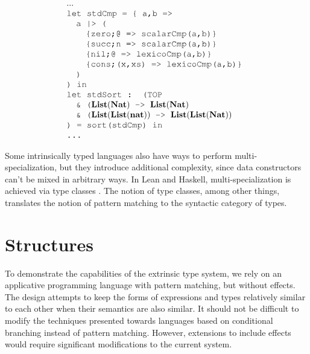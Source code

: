 \documentclass[acmsmall]{acmart}
\theoremstyle{definition}
\begin{document}
\[
  \begin{array}[t]{@{} l}
    ...
    \\
    \J{let stdCmp = \{ a,b => } 
    \\
    \I \J{a |> (}
    \\
    \I\I \J{\{zero;@ => scalarCmp(a,b)\}}
    \\
    \I\I \J{\{succ;n => scalarCmp(a,b)\}}
    \\
    \I\I \J{\{nil;@ => lexicoCmp(a,b)\}}
    \\
    \I\I \J{\{cons;(x,xs) => lexicoCmp(a,b)\}}
    \\
    \I \J{)}
    \\
    \J{) in} 
    \\
    \J{let stdSort : (TOP}
    \\
    \I \J{\& (}\textbf{List}(\textbf{Nat}) \J{ -> } \textbf{List}(\textbf{Nat})
    \\
    \I \J{\& (}\textbf{List}(\textbf{List}(\textbf{nat})) \J{ -> } \textbf{List}(\textbf{List}(\textbf{Nat}))
    \\
    \J{) = sort(stdCmp) in}
    \\
    \J{...} 
  \end{array}
\]

\noindent
Some intrinsically typed languages also have ways to perform multi-specialization, but they introduce additional
complexity, since data constructors can't be mixed in arbitrary ways. In Lean and Haskell, multi-specialization
is achieved via type classes \cite{}. 
The notion of type classes, among other things, translates the notion of pattern matching to the syntactic category of types.

\section{Structures}
\label{sec:structures}
To demonstrate the capabilities of the extrinsic type system, we rely on an applicative
programming language with pattern matching, but without effects.
The design attempts to keep the forms of expressions and types relatively 
similar to each other when their semantics are also similar. 
It should not be difficult to modify the techniques presented towards
languages based on conditional branching instead of pattern matching. However,
extensions to include effects would require 
significant modifications to the current system.
\end{document}
